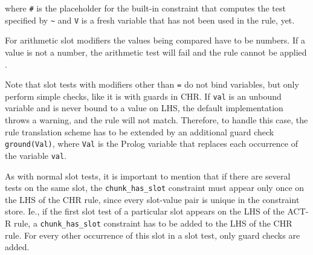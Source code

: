 where \lstinline|#| is the placeholder for the built-in constraint that computes the test specified by \lstinline|~| and \lstinline|V| is a fresh variable that has not been used in the rule, yet.

For arithmetic slot modifiers the values being compared have to be numbers. If a value is not a number, the arithmetic test will fail and the rule cannot be applied \cite{actr_reference}.

Note that slot tests with modifiers other than \lstinline|=| do not bind variables, but only perform simple checks, like it is with guards in CHR. If \lstinline|val| is an unbound variable and is never bound to a value on LHS, the default implementation throws a warning, and the rule will not match. Therefore, to handle this case, the rule translation scheme has to be extended by an additional guard check \lstinline|ground(Val)|, where \lstinline|Val| is the Prolog variable that replaces each occurrence of the variable \lstinline|val|.

As with normal slot tests, it is important to mention that if there are several tests on the same slot, the \lstinline|chunk_has_slot| constraint must appear only once on the LHS of the CHR rule, since every slot-value pair is unique in the constraint store. Ie., if the first slot test of a particular slot appears on the LHS of the ACT-R rule, a \lstinline|chunk_has_slot| constraint has to be added to the LHS of the CHR rule. For every other occurrence of this slot in a slot test, only guard checks are added.

